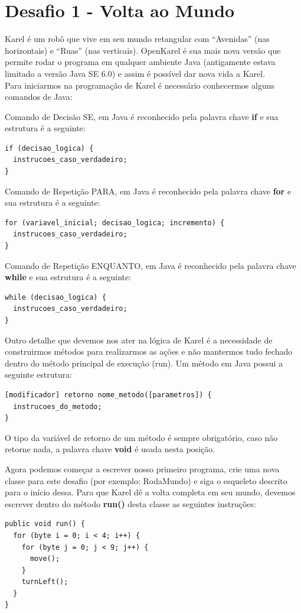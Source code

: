 \documentclass[a4paper,11pt]{article}
\begin{document}
\section{Desafio 1 - Volta ao Mundo}
Karel é um robô que vive em seu mundo retangular com ``Avenidas'' (nas horizontais) e ``Ruas'' (nas verticais). OpenKarel é sua mais nova versão que 
permite rodar o programa em qualquer ambiente Java (antigamente estava limitado a versão Java SE 6.0) e assim é possível dar nova vida a Karel. \\[3mm]
Para iniciarmos na programação de Karel é necessário conhecermos alguns comandos de Java:

Comando de Decisão SE, em Java é reconhecido pela palavra chave \textbf{if} e sua estrutura é a seguinte:
\begin{lstlisting}
if (decisao_logica) {
  instrucoes_caso_verdadeiro;
}
\end{lstlisting}

Comando de Repetição PARA, em Java é reconhecido pela palavra chave \textbf{for} e sua estrutura é a seguinte:
\begin{lstlisting}
for (variavel_inicial; decisao_logica; incremento) {
  instrucoes_caso_verdadeiro;
}
\end{lstlisting}

Comando de Repetição ENQUANTO, em Java é reconhecido pela palavra chave \textbf{while} e sua estrutura é a seguinte:
\begin{lstlisting}
while (decisao_logica) {
  instrucoes_caso_verdadeiro;
}
\end{lstlisting}

Outro detalhe que devemos nos ater na lógica de Karel é a necessidade de construirmos métodos para realizarmos as ações e não mantermos tudo fechado dentro do método principal de execução (run). Um método em Java possui a seguinte estrutura:
\begin{lstlisting}
[modificador] retorno nome_metodo([parametros]) {
  instrucoes_do_metodo;
}
\end{lstlisting}

O tipo da variável de retorno de um método é sempre obrigatório, caso não retorne nada, a palavra chave \textbf{void} é usada nesta posição.

Agora podemos começar a escrever nosso primeiro programa, crie uma nova classe para este desafio (por exemplo: RodaMundo) e siga o esqueleto descrito para o início dessa. Para que Karel dê a volta completa em seu mundo, devemos escrever dentro do método \textbf{run()} desta classe as seguintes instruções:
\begin{lstlisting}
public void run() {
  for (byte i = 0; i < 4; i++) {
    for (byte j = 0; j < 9; j++) {
      move();
    }
    turnLeft();
  }
}
\end{lstlisting}
\end{document}
